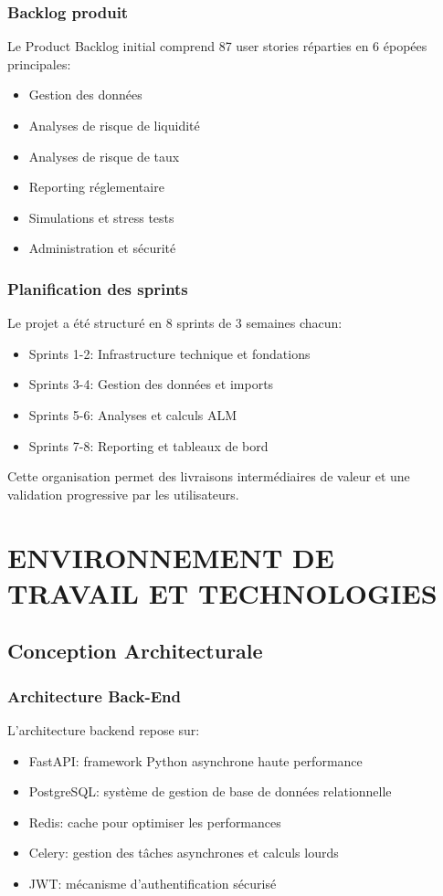 \documentclass[12pt,a4paper]{report}
\begin{document}
\subsection{Backlog produit}
Le Product Backlog initial comprend 87 user stories réparties en 6 épopées principales:
\begin{itemize}
    \item Gestion des données
    \item Analyses de risque de liquidité
    \item Analyses de risque de taux
    \item Reporting réglementaire
    \item Simulations et stress tests
    \item Administration et sécurité
\end{itemize}

\subsection{Planification des sprints}
Le projet a été structuré en 8 sprints de 3 semaines chacun:
\begin{itemize}
    \item Sprints 1-2: Infrastructure technique et fondations
    \item Sprints 3-4: Gestion des données et imports
    \item Sprints 5-6: Analyses et calculs ALM
    \item Sprints 7-8: Reporting et tableaux de bord
\end{itemize}

Cette organisation permet des livraisons intermédiaires de valeur et une validation progressive par les utilisateurs.

\chapter{ENVIRONNEMENT DE TRAVAIL ET TECHNOLOGIES}

\section{Conception Architecturale}

\subsection{Architecture Back-End}
L'architecture backend repose sur:
\begin{itemize}
    \item FastAPI: framework Python asynchrone haute performance
    \item PostgreSQL: système de gestion de base de données relationnelle
    \item Redis: cache pour optimiser les performances
    \item Celery: gestion des tâches asynchrones et calculs lourds
    \item JWT: mécanisme d'authentification sécurisé
\end{itemize}
\end{document}
